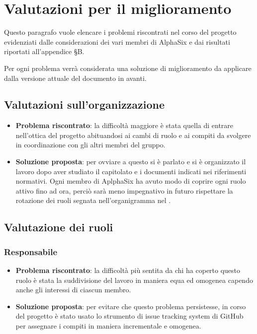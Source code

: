 \newpage
\section{Valutazioni per il miglioramento}
	
	Questo paragrafo vuole elencare i problemi riscontrati nel corso del progetto evidenziati dalle considerazioni dei vari membri di AlphaSix e dai risultati riportati all'appendice §B.
	
	Per ogni problema verrà considerata una soluzione di miglioramento da applicare dalla versione attuale del documento in avanti.

	\subsection{Valutazioni sull'organizzazione}
		\begin{itemize}
			\item \textbf{Problema riscontrato}: la difficoltà maggiore è stata quella di entrare nell'ottica del progetto abituandosi ai cambi di ruolo e ai compiti da svolgere in coordinazione con gli altri membri del gruppo.
			\item \textbf{Soluzione proposta}: per ovviare a questo si è parlato e si è organizzato il lavoro dopo aver studiato il capitolato e i documenti indicati nei riferimenti normativi. Ogni membro di AplphaSix ha avuto modo di coprire ogni ruolo attivo fino ad ora, perciò sarà meno impegnativo in futuro rispettare la rotazione dei ruoli segnata nell'organigramma nel \Doc{\PdPv}.
		\end{itemize}
	
	\subsection{Valutazione dei ruoli}
	
		\subsubsection{Responsabile}
			\begin{itemize}
				\item \textbf{Problema riscontrato}: la difficoltà più sentita da chi ha coperto questo ruolo è stata la suddivisione del lavoro in maniera equa ed omogenea capendo anche gli interessi di ciascun membro.
				\item \textbf{Soluzione proposta}: per evitare che questo problema persistesse, in corso del progetto è stato usato lo strumento di issue tracking system di GitHub per assegnare i compiti in maniera incrementale e omogenea.
			\end{itemize}

